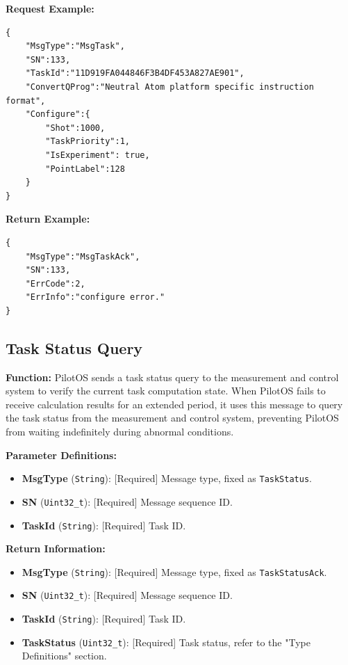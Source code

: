 \documentclass[12pt, a4paper]{article}
\begin{document}
\noindent \textbf{Request Example:}
\begin{lstlisting}
{
    "MsgType":"MsgTask",
    "SN":133,
    "TaskId":"11D919FA044846F3B4DF453A827AE901",
    "ConvertQProg":"Neutral Atom platform specific instruction format",
    "Configure":{
        "Shot":1000,
        "TaskPriority":1,
        "IsExperiment": true,
        "PointLabel":128
    }
}
\end{lstlisting}

\noindent \textbf{Return Example:}
\begin{lstlisting}
{
    "MsgType":"MsgTaskAck",
    "SN":133,
    "ErrCode":2,
    "ErrInfo":"configure error."
}
\end{lstlisting}

\subsection{Task Status Query}

\textbf{Function:} PilotOS sends a task status query to the measurement and control system to verify the current task computation state. When PilotOS fails to receive calculation results for an extended period, it uses this message to query the task status from the measurement and control system, preventing PilotOS from waiting indefinitely during abnormal conditions.

\textbf{Parameter Definitions:}
\begin{itemize}
    \item \textbf{MsgType} (\texttt{String}): [Required] Message type, fixed as \texttt{TaskStatus}.
    \item \textbf{SN} (\texttt{Uint32\_t}): [Required] Message sequence ID.
    \item \textbf{TaskId} (\texttt{String}): [Required] Task ID.
\end{itemize}

\textbf{Return Information:}
\begin{itemize}
    \item \textbf{MsgType} (\texttt{String}): [Required] Message type, fixed as \texttt{TaskStatusAck}.
    \item \textbf{SN} (\texttt{Uint32\_t}): [Required] Message sequence ID.
    \item \textbf{TaskId} (\texttt{String}): [Required] Task ID.
    \item \textbf{TaskStatus} (\texttt{Uint32\_t}): [Required] Task status, refer to the "Type Definitions" section.
\end{itemize}
\end{document}
